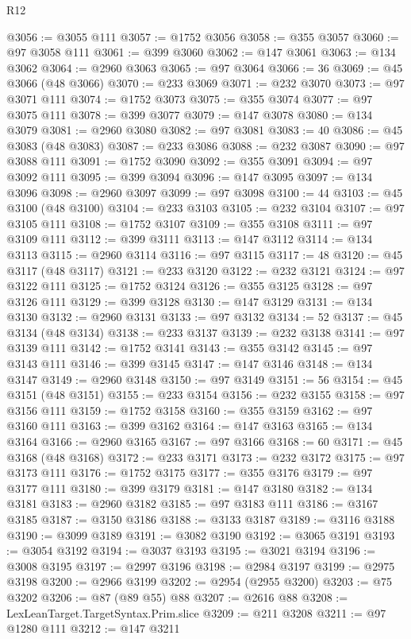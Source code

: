 \begin{lexlean}{R12}
\begin{coremodule}
@3056 := @3055 @111
@3057 := @1752 @3056
@3058 := @355 @3057
@3060 := @97 @3058 @111
@3061 := @399 @3060
@3062 := @147 @3061
@3063 := @134 @3062
@3064 := @2960 @3063
@3065 := @97 @3064
@3066 := 36
@3069 := @45 @3066 (@48 @3066)
@3070 := @233 @3069
@3071 := @232 @3070
@3073 := @97 @3071 @111
@3074 := @1752 @3073
@3075 := @355 @3074
@3077 := @97 @3075 @111
@3078 := @399 @3077
@3079 := @147 @3078
@3080 := @134 @3079
@3081 := @2960 @3080
@3082 := @97 @3081
@3083 := 40
@3086 := @45 @3083 (@48 @3083)
@3087 := @233 @3086
@3088 := @232 @3087
@3090 := @97 @3088 @111
@3091 := @1752 @3090
@3092 := @355 @3091
@3094 := @97 @3092 @111
@3095 := @399 @3094
@3096 := @147 @3095
@3097 := @134 @3096
@3098 := @2960 @3097
@3099 := @97 @3098
@3100 := 44
@3103 := @45 @3100 (@48 @3100)
@3104 := @233 @3103
@3105 := @232 @3104
@3107 := @97 @3105 @111
@3108 := @1752 @3107
@3109 := @355 @3108
@3111 := @97 @3109 @111
@3112 := @399 @3111
@3113 := @147 @3112
@3114 := @134 @3113
@3115 := @2960 @3114
@3116 := @97 @3115
@3117 := 48
@3120 := @45 @3117 (@48 @3117)
@3121 := @233 @3120
@3122 := @232 @3121
@3124 := @97 @3122 @111
@3125 := @1752 @3124
@3126 := @355 @3125
@3128 := @97 @3126 @111
@3129 := @399 @3128
@3130 := @147 @3129
@3131 := @134 @3130
@3132 := @2960 @3131
@3133 := @97 @3132
@3134 := 52
@3137 := @45 @3134 (@48 @3134)
@3138 := @233 @3137
@3139 := @232 @3138
@3141 := @97 @3139 @111
@3142 := @1752 @3141
@3143 := @355 @3142
@3145 := @97 @3143 @111
@3146 := @399 @3145
@3147 := @147 @3146
@3148 := @134 @3147
@3149 := @2960 @3148
@3150 := @97 @3149
@3151 := 56
@3154 := @45 @3151 (@48 @3151)
@3155 := @233 @3154
@3156 := @232 @3155
@3158 := @97 @3156 @111
@3159 := @1752 @3158
@3160 := @355 @3159
@3162 := @97 @3160 @111
@3163 := @399 @3162
@3164 := @147 @3163
@3165 := @134 @3164
@3166 := @2960 @3165
@3167 := @97 @3166
@3168 := 60
@3171 := @45 @3168 (@48 @3168)
@3172 := @233 @3171
@3173 := @232 @3172
@3175 := @97 @3173 @111
@3176 := @1752 @3175
@3177 := @355 @3176
@3179 := @97 @3177 @111
@3180 := @399 @3179
@3181 := @147 @3180
@3182 := @134 @3181
@3183 := @2960 @3182
@3185 := @97 @3183 @111
@3186 := @3167 @3185
@3187 := @3150 @3186
@3188 := @3133 @3187
@3189 := @3116 @3188
@3190 := @3099 @3189
@3191 := @3082 @3190
@3192 := @3065 @3191
@3193 := @3054 @3192
@3194 := @3037 @3193
@3195 := @3021 @3194
@3196 := @3008 @3195
@3197 := @2997 @3196
@3198 := @2984 @3197
@3199 := @2975 @3198
@3200 := @2966 @3199
@3202 := @2954 (@2955 @3200)
@3203 := @75 @3202
@3206 := @87 (@89 @55) @88
@3207 := @2616 @88
@3208 := LexLeanTarget.TargetSyntax.Prim.slice
@3209 := @211 @3208
@3211 := @97 @1280 @111
@3212 := @147 @3211

\end{coremodule}
\end{lexlean}
